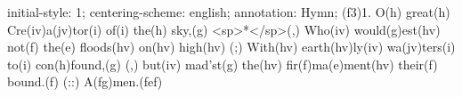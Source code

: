 initial-style: 1;
centering-scheme: english;
annotation: Hymn;
(f3)1. O(h) great(h) Cre(iv)a(jv)tor(i) of(i) the(h) sky,(g) <sp>*</sp>(,)
Who(iv) would(g)est(hv) not(f) the(e) floods(hv) on(hv) high(hv) (;)
With(hv) earth(hv)ly(iv) wa(jv)ters(i) to(i) con(h)found,(g) (,)
but(iv) mad'st(g) the(hv) fir(f)ma(e)ment(hv) their(f) bound.(f) (::)
A(fg)men.(fef)